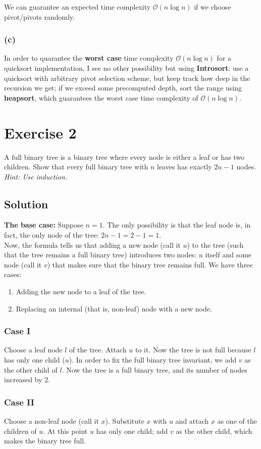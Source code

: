 \documentclass[10pt]{article}
\begin{document}
We can guarantee an expected time complexity $\mathcal{O}(n \log n)$ if we choose pivot/pivots randomly.

\subsubsection*{(c)} In order to quarantee the \textbf{worst case} time complexity $\mathcal{O}(n \log n)$ for a quicksort implementation, I see no other possibility but using \textbf{Introsort}: use a quicksort with arbitrary pivot selection scheme, but keep track how deep in the recursion we get; if we exceed some precomputed depth, sort the range using \textbf{heapsort}, which guarantees the worst case time complexity of $\mathcal{O}(n \log n)$.

\section*{Exercise 2}
\color{blue} A full binary tree is a binary tree where every node is either a leaf or has two children. Show that every full binary tree with $n$ leaves has exactly $2n - 1$ nodes. \textit{Hint: Use induction.}
\color{black}

\subsection*{Solution}
\textbf{The base case:} Suppose $n = 1$. The only possibility is that the leaf node is, in fact, the only node of the tree: $2n - 1 = 2 - 1 = 1$. \\
Now, the formula tells us that adding a new node (call it $u$) to the tree (such that the tree remains a full binary tree) introduces two nodes: $u$ itself and some node (call it $v$) that makes sure that the binary tree remains full. We have three cases:
\begin{enumerate}[label=(\Roman*)]
\item Adding the new node to a leaf of the tree.
\item Replacing an internal (that is, non-leaf) node with a new node.
\end{enumerate}

\subsubsection*{Case I} Choose a leaf node $l$ of the tree. Attach $u$ to it. Now the tree is not full because $l$ has only one child ($u$). In order to fix the full binary tree invariant, we add $v$ as the other child of $l$. Now the tree is a full binary tree, and its number of nodes increased by 2.

\subsubsection*{Case II} Choose a non-leaf node (call it $x$). Substitute $x$ with $u$ and attach $x$ as one of the children of $u$. At this point $u$ has only one child; add $v$ as the other child, which makes the binary tree full.
\end{document}
